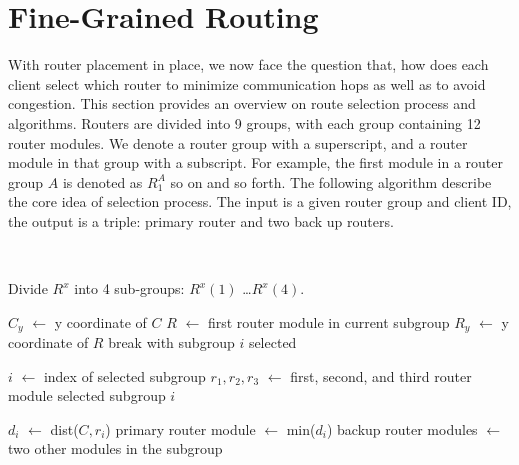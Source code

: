 \section{Fine-Grained Routing}

With router placement in place, we now face the question that, how does each
client select which router to minimize communication hops as well as to avoid
congestion. This section provides an overview on route selection process and
algorithms. Routers are divided into 9 groups, with each group containing 12
router modules. We denote a router group with a superscript, and a router
module in that group with a subscript. For example, the first module in a
router group $A$ is denoted as $R^A_1$ so on and so forth. The following
algorithm describe the core idea of selection process. The input is a given
router group and client ID, the output is a triple: primary router and two back
up routers.

\begin{algorithmic}[1]
 \\ \hrulefill

\State Divide $R^x$ into 4 sub-groups: $R^x(1)$ \ldots $R^x(4)$.

    \State $C_y$ $\leftarrow$ y coordinate of $C$
    \State $R$ $\leftarrow$ first router module in current subgroup
    \State $R_y$ $\leftarrow$ y coordinate of $R$
    \State break with subgroup $i$ selected
    \EndIf
\EndFor

\State $i$ $\leftarrow$ index of selected subgroup
\State $r_1, r_2, r_3$ $\leftarrow$ first, second, and third router module 
\State \hspace{\algorithmicindent} selected subgroup $i$

    \State $d_i$ $\leftarrow$ dist($C, r_i$) 
    \State primary router module $\leftarrow$ min($d_i$)
    \State backup router modules $\leftarrow$ 
     two other modules in the subgroup 
\EndFor

\EndProcedure
\\\hrulefill
\end{algorithmic}





